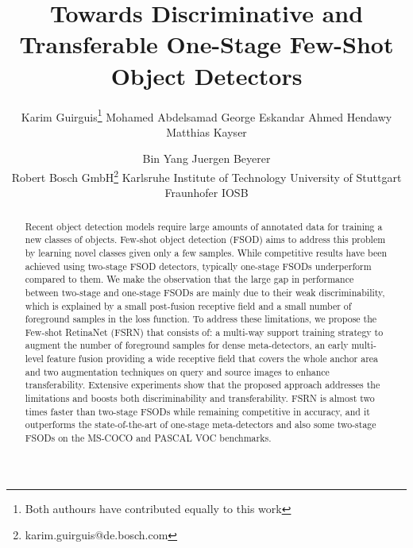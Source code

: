 \documentclass[10pt,twocolumn,letterpaper]{article}
\begin{document}
\title{Towards Discriminative and Transferable One-Stage Few-Shot Object Detectors\vspace{-1em}}





\author{
Karim Guirguis\thanks{Both authours have contributed equally to this work} \hspace{1mm}
Mohamed Abdelsamad\hspace{1mm}
George Eskandar\hspace{1mm}
Ahmed Hendawy\hspace{1mm}
Matthias Kayser\\ \vspace{-5mm}
\and 
Bin Yang \hspace{1mm}
Juergen Beyerer\\ 
{\normalsize Robert Bosch GmbH\thanks{karim.guirguis@de.bosch.com}}\hspace{1mm}
{\normalsize Karlsruhe Institute of Technology}
{\normalsize University of Stuttgart}
{\normalsize Fraunhofer IOSB}
\vspace{-2em}
}


\clearpage 
\maketitle

\thispagestyle{empty}

\begin{abstract}
\vspace{-1em}
Recent object detection models require large amounts of annotated data for training a new classes of objects. Few-shot object detection (FSOD) aims to address this problem by learning novel classes given only a few samples. While competitive results have been achieved using two-stage FSOD detectors, typically one-stage FSODs underperform compared to them. We make the observation that the large gap in performance between two-stage and one-stage FSODs are mainly due to their weak discriminability, which is explained by a small post-fusion receptive field and a small number of foreground samples in the loss function. To address these limitations, we propose the Few-shot RetinaNet (FSRN) that consists of: a multi-way support training strategy to augment the number of foreground samples for dense meta-detectors, an early multi-level feature fusion providing a wide receptive field that covers the whole anchor area and two augmentation techniques on query and source images to enhance transferability. Extensive experiments show that the proposed approach addresses the limitations and boosts both discriminability and transferability. FSRN is almost two times faster than two-stage FSODs while remaining competitive in accuracy, and it outperforms the state-of-the-art of one-stage meta-detectors and also some two-stage FSODs on the MS-COCO and PASCAL VOC benchmarks.
\end{abstract}
\vspace{-2em}
\end{document}
